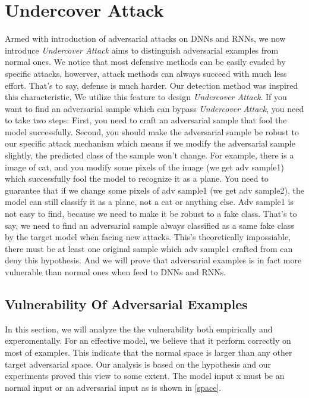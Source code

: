 \documentclass{article}
\begin{document}
\section{Undercover Attack}

Armed with introduction of adversarial attacks on DNNs and RNNs, we now introduce \emph{Undercover Attack} aims to distinguish adversarial examples from 
normal ones. We notice that most defensive methods can be easily evaded by specific attacks, howerver, attack methods can always succeed with much less effort. That's to say, defense is much harder. Our detection method was inspired this characteristic, We utilize this feature to design \emph{Undercover Attack}. If you want to find an adversarial sample which can bypass \emph{Undercover Attack}, you need to take two steps: First, you need to craft an adversarial sample that fool the model successfully. Second, you should make the adversarial sample be robust to our specific attack mechanism which means if we modify the adversarial sample slightly, the predicted class of the sample won't change. For example, there is a image of cat, and you modify some pixels of the image (we get adv sample1) which successfully fool the model to recognize it as a plane. You need to guarantee that if we change some pixels of adv sample1 (we get adv sample2), the model can still classify it as a plane, not a cat or anything else. Adv sample1 is not easy to find, because we need to make it be robust to a fake class. That's to say, we need to find an adversarial sample always classified as a same fake class by the target model when facing new attacks. This's theoretically impossiable, there must be at least one original sample which adv sample1 crafted from can deny this hypothesis. And we will prove that adversarial examples is in fact more vulnerable than normal ones when feed to DNNs and RNNs.

\subsection{Vulnerability Of Adversarial Examples}

In this section, we will analyze the the vulnerability both empirically and experomentally. For an effective model, we believe that it perform correctly on most of examples. This indicate that the normal space is larger than any other target adversarial space. Our analysis is based on the hypothesis and our experiments proved this view to some extent. The model input x must be an normal input or an adversarial input as is shown in \ref{space}.
\end{document}
